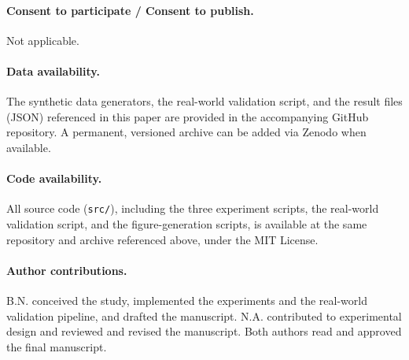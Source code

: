 \documentclass[11pt,a4paper]{article}
\begin{document}
\paragraph{Consent to participate / Consent to publish.} Not applicable.

\paragraph{Data availability.} The synthetic data generators, the real-world validation script, and the result files (JSON) referenced in this paper are provided in the accompanying GitHub repository. A permanent, versioned archive can be added via Zenodo when available.

\paragraph{Code availability.} All source code (\texttt{src/}), including the three experiment scripts, the real-world validation script, and the figure-generation scripts, is available at the same repository and archive referenced above, under the MIT License.

\paragraph{Author contributions.} B.N. conceived the study, implemented the experiments and the real-world validation pipeline, and drafted the manuscript. N.A. contributed to experimental design and reviewed and revised the manuscript. Both authors read and approved the final manuscript.
\end{document}
